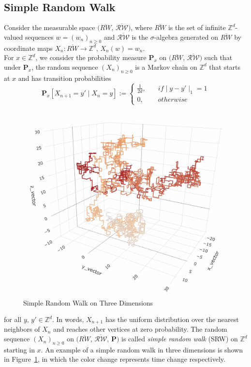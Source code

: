 \documentclass[
11pt, %
a4paper, %
oneside, %
headinclude,footinclude, %
BCOR5mm, %
]{scrartcl}
\begin{document}
\subsection{Simple Random Walk}
Consider the measurable space $(\overline{RW}$, $\overline{\mathscr{RW}})$, where $\overline{RW}$ is the set of infinite $\mathbb{Z}^d$-valued sequences $w = (w_n)_{n \geq 0}$ and $\overline{\mathscr{RW}}$ is the $\sigma$-algebra generated on $\overline{RW}$ by coordinate maps $X_n : \overline{RW} \to \mathbb{Z}^d$, $X_n(w)=w_n$. 
\\For $x \in \mathbb{Z}^d$, we consider the probability measure $\mathbf{P}_x$ on $(\overline{RW}$, $\overline{\mathscr{RW}})$ such that under $\mathbf{P}_x$, the random sequence $(X_n)_{n \geq 0}$ is a Markov chain on $\mathbb{Z}^d$ that starts at $x$ and has transition probabilities
\begin{equation}
\mathbf{P}_x[X_{n+1}=y' \mid X_n=y]:=\left\{
\begin{aligned}
\frac{1}{2d}, & \quad if \mid y-y' \mid_1 =1\\
0, & \quad otherwise
\end{aligned}
\right.\tag{2.1}
\end{equation}
\begin{figure}[htb]
    \centering
    \includegraphics[width=.6\columnwidth]{Figures/3d rw fixed.png}
    \caption{Simple Random Walk on Three Dimensions}
    \label{3dSRW}
\end{figure}
for all $y$, $y' \in \mathbb{Z}^d$. In words, $X_{n+1}$ has the uniform distribution over the nearest neighbors of $X_n$ and reaches other vertices at zero probability. The random sequence $(X_n)_{n \geq 0}$ on $(\overline{RW}$, $\overline{\mathscr{RW}}$, $\mathbf{P})$ is called \textit{simple random walk} (SRW) on $\mathbb{Z}^d$ starting in $x$. An example of a simple random walk in three dimensions is shown in Figure~\ref{3dSRW}, in which the color change represents time change respectively.
\end{document}
